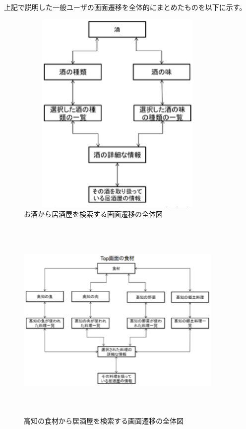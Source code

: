 \documentclass[a4j,titlepage]{jarticle}
\begin{document}
上記で説明した一般ユーザの画面遷移を全体的にまとめたものを以下に示す。



\begin {figure}[!htbp]
    \begin{center}
    \includegraphics [height=10cm, width=10cm]{19.eps}
    \caption {お酒から居酒屋を検索する画面遷移の全体図}
    \label {fig:19}
    \end{center}
\end {figure}



\begin {figure}[!htbp]
    \begin{center}
    \includegraphics [height=10cm, width=10cm]{20.eps}
    \caption {高知の食材から居酒屋を検索する画面遷移の全体図}
    \label {fig:20}
    \end{center}
\end {figure}
\end{document}
